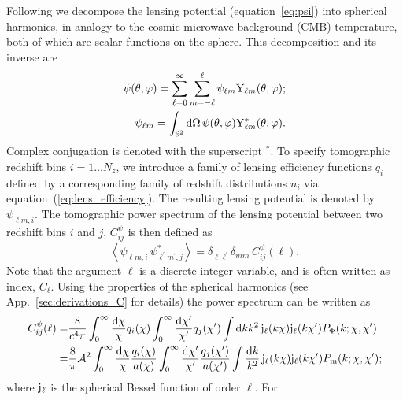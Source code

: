 \documentclass[fleqn,usenatbib]{mnras} %
\newcommand{\pref}{{\cal A}}
\begin{document}
Following \cite{2000PhRvD..62d3007H} we decompose the lensing
potential (equation~\ref{eq:psi}) into spherical harmonics, in analogy
to the cosmic microwave background (CMB)
temperature, both of which are scalar functions on the sphere. This
decomposition and its inverse are
%
%
\begin{align}
  \psi(\theta, \varphi) = \sum_{\ell=0}^\infty \sum_{m=-\ell}^\ell \psi_{\ell m} {\rm Y}_{\ell m}(\theta, \varphi);
    \label{eq:psi_harm_exp}
    \\
  \psi_{\ell m} = \int_{\mathbb{S}^2} {\rm d} \Omega \, \psi(\theta, \varphi) {\rm Y}^\ast_{\ell m}(\theta, \varphi).
  \label{eq:psi_harm_exp_inv}
\end{align}
%
Complex conjugation is denoted with the superscript $^\ast$.
To specify tomographic redshift bins $i=1\ldots N_z$, we introduce a family
of lensing efficiency functions $q_i$ defined by a corresponding family of
redshift distributions $n_i$ via equation~(\ref{eq:lens_efficiency}). The resulting
lensing potential is denoted by $\psi_{\ell m, i}$. The tomographic power
spectrum of the lensing potential between two redshift bins $i$ and $j$,
$C_{ij}^\psi$ \citep{pee80} is then defined as
%
\begin{equation}
  \left\langle \psi^{}_{\ell m, i} \, \psi^\ast_{\ell^\prime m^\prime, j} \right\rangle
    = \delta_{\ell \ell^\prime} \delta_{m m^\prime} C^\psi_{ij}(\ell) .
  \label{eq:C_ell_psi}
\end{equation}
%
Note that the argument $\ell$ is a discrete integer variable, and is often written as index, $C_\ell$.
Using the properties of the spherical harmonics (see
App.~\ref{sec:derivations_C} for details) the power spectrum can be written as
%
\begin{align}
  C_{ij}^\psi(\ell) = & \frac 8 {c^4 \pi} 
  \int_0^\infty \frac{{\rm d}\chi}{\chi} q_i(\chi)
  \int_0^\infty \frac{{\rm d}\chi^\prime}{\chi^\prime} q_j(\chi^\prime)
  \int {\rm d} k k^2 \, {\rm j}_\ell(k \chi) {\rm j}_\ell(k \chi^\prime) P_\Phi(k; \chi, \chi^\prime)
  \label{eq:C_ell_phi_Pphi} \\
  = & \frac 8 \pi \pref^2
  \int_0^\infty \frac{{\rm d}\chi}{\chi} \frac{q_i(\chi)}{a(\chi)}
  \int_0^\infty \frac{{\rm d}\chi^\prime}{\chi^\prime} \frac{q_j(\chi^\prime)}{a(\chi^\prime)}
  \int \frac{{\rm d} k}{k^2} \, {\rm j}_\ell(k \chi) {\rm j}_\ell(k \chi^\prime) P_{\rm m}(k; \chi, \chi^\prime) ;
  \label{eq:C_ell_phi_Pm}
\end{align}
%
where ${\rm j}_\ell$ is the spherical Bessel function of order $\ell$. For
\end{document}
